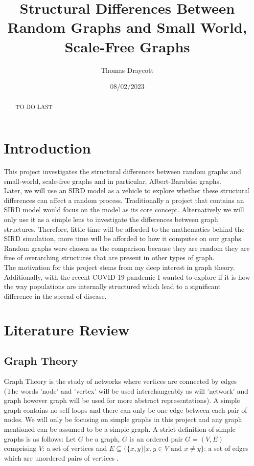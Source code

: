 \documentclass{article}
\title{Structural Differences Between Random Graphs and Small World, Scale-Free Graphs }
\date{08/02/2023}
\author{Thomas Draycott}
\begin{document}
    \maketitle
    \newpage
    \begin{abstract}
        TO DO LAST
    \end{abstract}
    \tableofcontents
    \newpage
    \section{Introduction}
    This project investigates the structural differences between random graphs and small-world, scale-free graphs and in particular, Albert-Barabási graphs.\\
    Later, we will use an SIRD model as a vehicle to explore whether these structural differences can affect a random process. Traditionally a project that contains an SIRD model would focus on the model as its core concept. Alternatively we will only use it as a simple lens to investigate the differences between graph structures. Therefore, little time will be afforded to the mathematics behind the SIRD simulation, more time will be afforded to how it computes on our graphs.\\
    Random graphs were chosen as the comparison because they are random they are free of overarching structures that are present in other types of graph.\\
    The motivation for this project stems from my deep interest in graph theory. Additionally, with the recent COVID-19 pandemic I wanted to explore if it is how the way populations are internally structured which lead to a significant difference in the spread of disease.
    \section{Literature Review}
        \subsection{Graph Theory}
        Graph Theory is the study of networks where vertices are connected by edges (The words 'node' and 'vertex' will be used interchangeably as will 'network' and graph however graph will be used for more abstract representations). A simple graph contains no self loops and there can only be one edge between each pair of nodes. We will only be focusing on simple graphs in this project and any graph mentioned can be assumed to be a simple graph. A strict definition of simple graphs is as follows: Let $G$ be a graph, $G$ is an ordered pair $G=(V,E)$ comprising $V$: a set of vertices and $E\subseteq \{\{x,y\} | x,y \in V \text{ and } x\neq y\}$: a set of edges which are unordered pairs of vertices \parencite{bender2010lists}.
\end{document}
